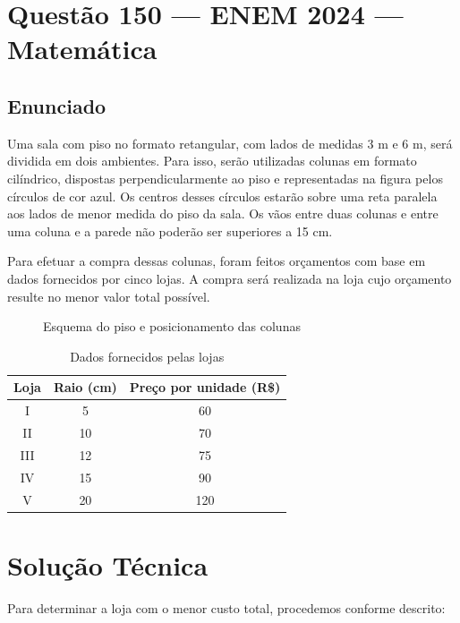 \documentclass{article}
\begin{document}
\section*{Questão 150 — ENEM 2024 — Matemática}

\subsection*{Enunciado}
Uma sala com piso no formato retangular, com lados de medidas 3 m e 6 m, será dividida em dois ambientes. Para isso, serão utilizadas colunas em formato cilíndrico, dispostas perpendicularmente ao piso e representadas na figura pelos círculos de cor azul. Os centros desses círculos estarão sobre uma reta paralela aos lados de menor medida do piso da sala. Os vãos entre duas colunas e entre uma coluna e a parede não poderão ser superiores a 15 cm.

Para efetuar a compra dessas colunas, foram feitos orçamentos com base em dados fornecidos por cinco lojas. A compra será realizada na loja cujo orçamento resulte no menor valor total possível.

\begin{figure}[h!]
  \centering
  \caption{Esquema do piso e posicionamento das colunas}
\end{figure}

\begin{table}[h!]
  \centering
  \begin{tabular}{|c|c|c|}
    \hline
    \textbf{Loja} & \textbf{Raio (cm)} & \textbf{Preço por unidade (R\$)} \\
    \hline
    I & 5 & 60 \\
    II & 10 & 70 \\
    III & 12 & 75 \\
    IV & 15 & 90 \\
    V & 20 & 120 \\
    \hline
  \end{tabular}
  \caption{Dados fornecidos pelas lojas}
\end{table}

\section*{Solução Técnica}
Para determinar a loja com o menor custo total, procedemos conforme descrito:
\end{document}
